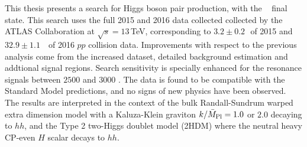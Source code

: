 This thesis presents a search for Higgs boson pair production, with the \bbbb~ final state. 
This search uses the full 2015 and 2016 data collected collected by the ATLAS Collaboration at $\sqrt{s}=13$\,TeV, corresponding to $3.2 \pm 0.2$\,\ifb\ of 2015 and $32.9 \pm 1.1$\, \ifb\ of 2016 $pp$ collision data.
Improvements with respect to the previous analysis come from the increased dataset, detailed background estimation and addtional signal regions. 
Search sensitivity is specially enhanced for the resonance signals between $2500$ \GeV and $3000$ \GeV.
The data is found to be compatible with the Standard Model predictions, and no signs of new physics have been observed.
The results are interpreted in the context of the bulk Randall-Sundrum warped extra dimension model with a Kaluza-Klein graviton $k/\bar{M}_{\rm Pl} = 1.0$ or $2.0$ decaying to $hh$, and the Type 2 two-Higgs doublet model (2HDM) where the neutral heavy CP-even $H$ scalar decays to $hh$.